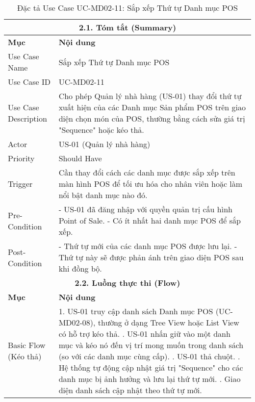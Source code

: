 \begin{longtable}{|m{4cm}|p{11cm}|}
\caption{Đặc tả Use Case UC-MD02-11: Sắp xếp Thứ tự Danh mục POS} \label{tab:uc_md02_11_revised} \\
\hline
\multicolumn{2}{|c|}{\textbf{2.1. Tóm tắt (Summary)}} \\
\hline
\textbf{Mục} & \textbf{Nội dung} \\
\hline
\endhead %
\hline
\endfoot %
\hline
\endlastfoot %
Use Case Name & Sắp xếp Thứ tự Danh mục POS \\
\hline
Use Case ID & UC-MD02-11 \\
\hline
Use Case Description & Cho phép Quản lý nhà hàng (US-01) thay đổi thứ tự xuất hiện của các Danh mục Sản phẩm POS trên giao diện chọn món của POS, thường bằng cách sửa giá trị "Sequence" hoặc kéo thả. \\
\hline
Actor & US-01 (Quản lý nhà hàng) \\
\hline
Priority & Should Have \\
\hline
Trigger & Cần thay đổi cách các danh mục được sắp xếp trên màn hình POS để tối ưu hóa cho nhân viên hoặc làm nổi bật danh mục nào đó. \\
\hline
Pre-Condition & - US-01 đã đăng nhập với quyền quản trị cấu hình Point of Sale. \newline - Có ít nhất hai danh mục POS để sắp xếp. \\
\hline
Post-Condition & - Thứ tự mới của các danh mục POS được lưu lại. \newline - Thứ tự này sẽ được phản ánh trên giao diện POS sau khi đồng bộ. \\
\hline
\multicolumn{2}{|c|}{\textbf{2.2. Luồng thực thi (Flow)}} \\
\hline
\textbf{Mục} & \textbf{Nội dung} \\
\hline
Basic Flow (Kéo thả) & 1. US-01 truy cập danh sách Danh mục POS (UC-MD02-08), thường ở dạng Tree View hoặc List View có hỗ trợ kéo thả. \newline 2. US-01 nhấn giữ vào một danh mục và kéo nó đến vị trí mong muốn trong danh sách (so với các danh mục cùng cấp). \newline 3. US-01 thả chuột. \newline 4. Hệ thống tự động cập nhật giá trị "Sequence" cho các danh mục bị ảnh hưởng và lưu lại thứ tự mới. \newline 5. Giao diện danh sách cập nhật theo thứ tự mới. \\
\hline

\end{longtable}
